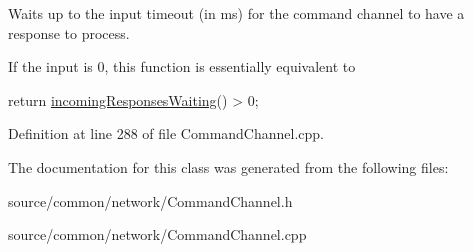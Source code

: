 Waits up to the input timeout (in ms) for the command channel to have a response to process. 

If the input is 0, this function is essentially equivalent to
\begin{DoxyCode}
\textcolor{keywordflow}{return} \hyperlink{class_picto_1_1_command_channel_a2178a704ecbacc3cc4b68af6949326d9}{incomingResponsesWaiting}() > 0; 
\end{DoxyCode}
 

Definition at line 288 of file Command\-Channel.\-cpp.



The documentation for this class was generated from the following files\-:\begin{DoxyCompactItemize}
\item 
source/common/network/Command\-Channel.\-h\item 
source/common/network/Command\-Channel.\-cpp\end{DoxyCompactItemize}
